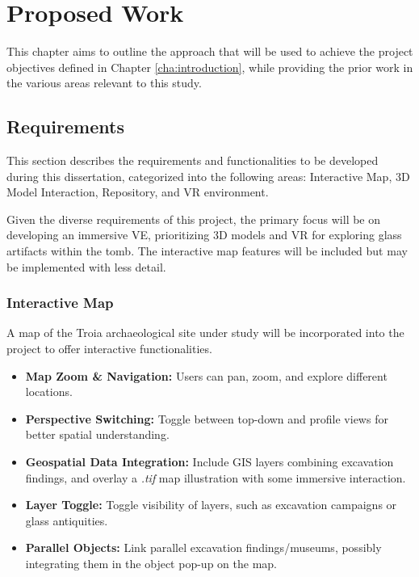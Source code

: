 
%

\chapter{Proposed Work}
\label{cha:proposed_work}

This chapter aims to outline the approach that will be used to achieve the project objectives defined in Chapter \ref{cha:introduction}, while providing the prior work in the various areas relevant to this study.

\section{Requirements}
\label{sec:requirements}

This section describes the requirements and functionalities to be developed during this dissertation, categorized into the following areas: Interactive Map, \gls{3D} Model Interaction, Repository, and \gls{VR} environment.

Given the diverse requirements of this project, the primary focus will be on developing an immersive \gls{VE}, prioritizing \gls{3D} models and \gls{VR} for exploring glass artifacts within the tomb. The interactive map features will be included but may be implemented with less detail.

\subsection*{Interactive Map}
A map of the Troia archaeological site under study will be incorporated into the project to offer interactive functionalities.
\begin{itemize}
    \item \textbf{Map Zoom \& Navigation:} Users can pan, zoom, and explore different locations.
    \item \textbf{Perspective Switching:} Toggle between top-down and profile views for better spatial understanding.
    \item \textbf{Geospatial Data Integration:} Include \gls{GIS} layers combining excavation findings, and overlay a \textit{.tif} map illustration with some immersive interaction.
    \item \textbf{Layer Toggle:} Toggle visibility of layers, such as excavation campaigns or glass antiquities.
    \item \textbf{Parallel Objects:} Link parallel excavation findings/museums, possibly integrating them in the object pop-up on the map.
\end{itemize}

